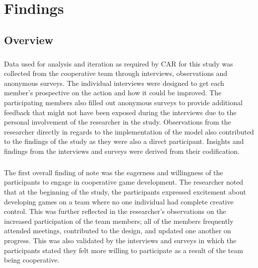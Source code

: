 \chapter{Findings}

\section{Overview}

\paragraph{} Data used for analysis and iteration as required by CAR for this study was collected from the cooperative team through interviews, observations and anonymous surveys. The individual interviews were designed to get each member's prospective on the action and how it could be improved. The participating members also filled out anonymous surveys to provide additional feedback that might not have been exposed during the interviews due to the personal involvement of the researcher in the study. Observations from the researcher directly in regards to the implementation of the model also contributed to the findings of the study as they were also a direct participant. Insights and findings from the interviews and surveys were derived from their codification.

\paragraph{} The first overall finding of note was the eagerness and willingness of the participants to engage in cooperative game development. The researcher noted that at the beginning of the study, the participants expressed excitement about developing games on a team where no one individual had complete creative control. This was further reflected in the researcher's observations on the increased participation of the team members; all of the members frequently attended meetings, contributed to the design, and updated one another on progress. This was also validated by the interviews and surveys in which the participants stated they felt more willing to participate as a result of the team being cooperative.

\paragraph{}


